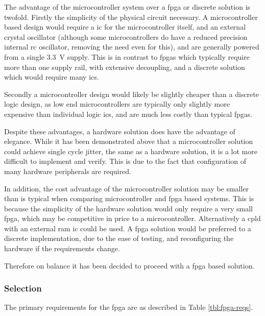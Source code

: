 The advantage of the microcontroller system over a \gls{fpga} or discrete solution is twofold. Firstly the simplicity of the physical circuit necessary. A microcontroller based design would require a \gls{ic} for the microcontroller itself, and an external crystal oscillator (although some microcontrollers do have a reduced precision internal \gls{rc} oscillator, removing the need even for this), and are generally powered from a single \SI{3.3}{\volt} supply. This is in contrast to \glspl{fpga} which typically require more than one supply rail, with extensive decoupling, and a discrete solution which would require many \glspl{ic}.

Secondly a microcontroller design would likely be slightly cheaper than a discrete logic design, as low end microcontrollers are typically only slightly more expensive than individual logic \glspl{ic}, and are much less costly than typical \glspl{fpga}.

Despite these advantages, a hardware solution does have the advantage of elegance. While it has been demonstrated above that a microcontroller solution could achieve single cycle jitter, the same as a hardware solution, it is a lot more difficult to implement and verify. This is due to the fact that configuration of many hardware peripherals are required.

In addition, the cost advantage of the microcontroller solution may be smaller than is typical when comparing microcontroller and \gls{fpga} based systems. This is because the simplicity of the hardware solution would only require a very small \gls{fpga}, which may be competitive in price to a microcontroller. Alternatively a \gls{cpld} with an external \gls{ram} \gls{ic} could be used. A \gls{fpga} solution would be preferred to a discrete implementation, due to the ease of testing, and reconfiguring the hardware if the requirements change.

Therefore on balance it has been decided to proceed with a \gls{fpga} based solution.

\subsubsection{ Selection}

The primary requirements for the \gls{fpga} are as described in Table \ref{tbl:fpga-reqs}.


